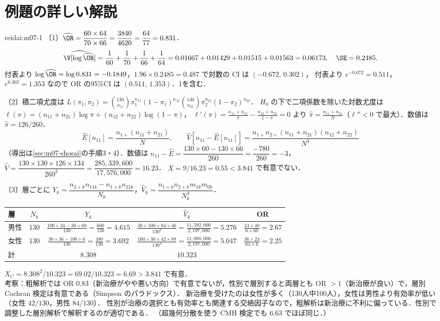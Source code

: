 \section{例題の詳しい解説}\label{sec:m07-kaisetsu}
\begin{kaitou}{reidai:m07-1}
〔1〕$\widehat\OR=\dfrac{60\times64}{70\times66}=\dfrac{3840}{4620}=\dfrac{64}{77}=0.831$．
\[
\widehat\V[\log\widehat\OR]=\frac1{60}+\frac1{70}+\frac1{66}+\frac1{64}=0.01667+0.01429+0.01515+0.01563=0.06173,\quad \SE=0.2485 .
\]
付表より $\log\widehat\OR=\log0.831=-0.1849$，$1.96\times0.2485=0.487$ で対数の CI は $(-0.672,\,0.302)$，
付表より $e^{-0.672}=0.511$，$e^{0.302}=1.353$ なので OR の95\%CI は $(0.511,\,1.353)$．1を含む．

〔2〕積二項尤度は $L(\pi_1,\pi_2)=\binom{130}{n_{11}}\pi_1^{n_{11}}(1-\pi_1)^{n_{12}}\binom{130}{n_{21}}\pi_2^{n_{21}}(1-\pi_2)^{n_{22}}$．
$H_0$ の下で二項係数を除いた対数尤度は $\ell(\pi)=(n_{11}+n_{21})\log\pi+(n_{12}+n_{22})\log(1-\pi)$，
$\ell'(\pi)=\frac{n_{11}+n_{21}}{\pi}-\frac{n_{12}+n_{22}}{1-\pi}=0$ より $\hat\pi=\frac{n_{11}+n_{21}}{N}$（$\ell''<0$ で最大）．数値は $\hat\pi=126/260$．
\[
\hat E[n_{11}]=\frac{n_{1+}(n_{11}+n_{21})}{N},\qquad
\hat V[n_{11}-\hat E[n_{11}]]=\frac{n_{1+}n_{2+}(n_{11}+n_{21})(n_{12}+n_{22})}{N^3}
\]
（導出は\cref{sec:m07-shosai}の手順3・4）．数値は
$n_{11}-\hat E=\dfrac{130\times60-130\times66}{260}=\dfrac{-780}{260}=-3$，
$\hat V=\dfrac{130\times130\times126\times134}{260^3}=\dfrac{285{,}339{,}600}{17{,}576{,}000}=16.23$．
$X=9/16.23=0.55<3.841$ で有意でない．

〔3〕層ごとに $Y_k=\dfrac{n_{2+k}n_{11k}-n_{1+k}n_{21k}}{N_k}$，$\hat V_k=\dfrac{n_{1+k}n_{2+k}m_{1k}m_{0k}}{N_k^3}$．
\begin{center}\small
\begin{tabular}{@{}lcccc@{}}
\toprule
層 & $N_k$ & $Y_k$ & $\hat V_k$ & OR\\
\midrule
男性 & 130 & $\frac{100\times24-30\times60}{130}=\frac{600}{130}=4.615$ & $\frac{30\times100\times84\times46}{130^3}=\frac{11{,}592{,}000}{2{,}197{,}000}=5.276$ & $\frac{24\times40}{6\times60}=2.67$\\
女性 & 130 & $\frac{30\times36-100\times6}{130}=\frac{480}{130}=3.692$ & $\frac{100\times30\times42\times88}{130^3}=\frac{11{,}088{,}000}{2{,}197{,}000}=5.047$ & $\frac{36\times24}{64\times6}=2.25$\\
\midrule
計 & & $8.308$ & $10.323$ & \\
\bottomrule
\end{tabular}
\end{center}
$X_C=8.308^2/10.323=69.02/10.323=6.69>3.841$ で有意．\\
考察：粗解析では OR $0.83$（新治療がやや悪い方向）で有意でないが，性別で層別すると両層とも OR $>1$（新治療が良い）で，層別 Cochran 検定は有意である（Simpson のパラドックス）．
新治療を受けたのは女性が多く（130人中100人），女性は男性より有効率が低い（女性 $42/130$，男性 $84/130$）．
性別が治療の選択とも有効率とも関連する交絡因子なので，粗解析は新治療に不利に偏っている．性別で調整した層別解析で解釈するのが適切である．
（超幾何分散を使う CMH 検定でも $6.63$ でほぼ同じ．）
\end{kaitou}

